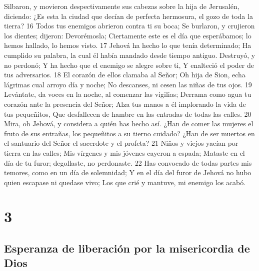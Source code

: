 Silbaron, y movieron despectivamente sus cabezas sobre la hija de Jerusalén, diciendo:
¿Es esta la ciudad que decían de perfecta hermosura, el gozo de toda la tierra?
16 Todos tus enemigos abrieron contra ti su boca;
Se burlaron, y crujieron los dientes; dijeron: Devorémosla;
Ciertamente este es el día que esperábamos; lo hemos hallado, lo hemos visto.
17 Jehová ha hecho lo que tenía determinado; 
Ha cumplido su palabra, la cual él había mandado desde tiempo antiguo.
Destruyó, y no perdonó;
Y ha hecho que el enemigo se alegre sobre ti, 
Y enalteció el poder de tus adversarios.
18 El corazón de ellos clamaba al Señor;
Oh hija de Sion, echa lágrimas cual arroyo día y noche;
No descanses, ni cesen las niñas de tus ojos.
19 Levántate, da voces en la noche, al comenzar las vigilias;
Derrama como agua tu corazón ante la presencia del Señor;
Alza tus manos a él implorando la vida de tus pequeñitos,
Que desfallecen de hambre en las entradas de todas las calles.
20 Mira, oh Jehová, y considera a quién has hecho así.
¿Han de comer las mujeres el fruto de sus entrañas, los pequeñitos a su tierno cuidado?
¿Han de ser muertos en el santuario del Señor el sacerdote y el profeta?
21 Niños y viejos yacían por tierra en las calles;
Mis vírgenes y mis jóvenes cayeron a espada;
Mataste en el día de tu furor; degollaste, no perdonaste.
22 Has convocado de todas partes mis temores, como en un día de solemnidad;
Y en el día del furor de Jehová no hubo quien escapase ni quedase vivo;
Los que crié y mantuve, mi enemigo los acabó.

\chapter{3}

\section*{Esperanza de liberación por la misericordia de Dios }

